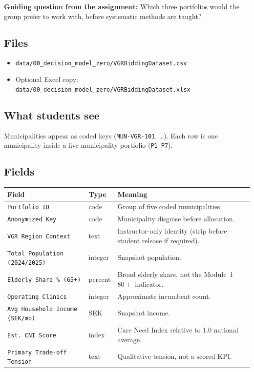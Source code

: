 \documentclass[11pt,a4paper]{article}
\begin{document}
\textbf{Guiding question from the assignment:}
Which three portfolios would the group prefer to work with, before
systematic methods are taught?

\subsection*{Files}

\begin{itemize}
    \item \texttt{data/00\_decision\_model\_zero/VGRBiddingDataset.csv}
    \item Optional Excel copy:
    \texttt{data/00\_decision\_model\_zero/VGRBiddingDataset.xlsx}
\end{itemize}

\subsection*{What students see}

Municipalities appear as coded keys (\texttt{MUN-VGR-101}, \ldots).
Each row is one municipality inside a five-municipality portfolio
(\texttt{P1}--\texttt{P7}).

\subsection*{Fields}

\begin{center}
\small
\begin{tabularx}{\textwidth}{@{}p{}p{}X@{}}
\toprule
Field & Type & Meaning \\
\midrule
\texttt{Portfolio ID} & code & Group of five coded municipalities. \\
\texttt{Anonymized Key} & code & Municipality disguise before allocation. \\
\texttt{VGR Region Context} & text & Instructor-only identity (strip before student release if required). \\
\texttt{Total Population (2024/2025)} & integer & Snapshot population. \\
\texttt{Elderly Share \% (65+)} & percent & Broad elderly share, not the Module~1 $80+$ indicator. \\
\texttt{Operating Clinics} & integer & Approximate incumbent count. \\
\texttt{Avg Household Income (SEK/mo)} & SEK & Snapshot income. \\
\texttt{Est. CNI Score} & index & Care Need Index relative to 1.0 national average. \\
\texttt{Primary Trade-off Tension} & text & Qualitative tension, not a scored KPI. \\
\bottomrule
\end{tabularx}
\end{center}
\end{document}
